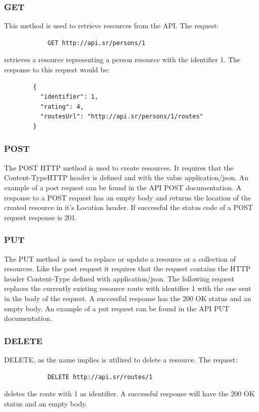         \subsubsection*{GET}
        This method is used to retrieve resources from the API. The request: 
        \begin{verbatim}
            GET http://api.sr/persons/1 
        \end{verbatim}
        \vspace{-\baselineskip}
        retrieves a resource representing a person resource with the identifier 1. 
        The response to this request would be:
        \begin{lstlisting}
        {
          "identifier": 1,
          "rating": 4,
          "routesUrl": "http://api.sr/persons/1/routes"
        }
        \end{lstlisting}

        \subsubsection*{POST}
        The POST HTTP method is used to create resources. It requires that the Content-Type\cite{contenttype}HTTP header is 
        defined and with the value application/json\cite{applicationjson}. An example of a post request can be found in the 
        API POST\cite{apipostdocs} documentation. A response to a POST request has an empty body and returns the 
        location of the created resource in it's Location header. If successful the status code of a POST request response is 201.  
            
        \subsubsection*{PUT}
        The PUT method is used to replace or update a resource or a collection of resources. Like the post request it requires 
        that the request contains the HTTP header Content-Type defined with application/json.
        The following request replaces the currently existing resource route with identifier 1 with the one sent in 
        the body of the request. A successful response has the 200 OK status and an empty body. An example of a put 
        request can be found in the API PUT\cite{apiputdocs} documentation.

        \subsubsection*{DELETE}
        DELETE, as the name implies is utilized to delete a resource. The request: 
        \begin{verbatim}
            DELETE http://api.sr/routes/1
        \end{verbatim}
        \vspace{-\baselineskip} 
        deletes the route with 1 as identifier. A successful response will have the 200 OK status and an empty body.
    
